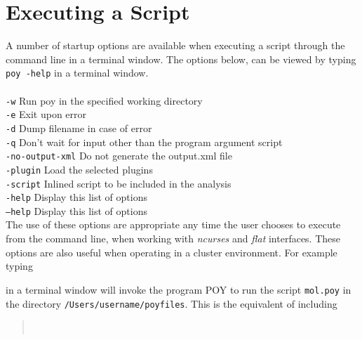 \section {Executing a Script}
\label {sec: ExecutingScript}
A number of startup options are available when executing a script through the command line in a 
terminal window. The options below, can be viewed by typing \texttt{poy -help} in a terminal window.\\
\\
\texttt{-w} \hspace{0.25 cm} Run poy in the specified working directory\\
\texttt{-e}  \hspace{0.25 cm} Exit upon error\\
\texttt{-d}  \hspace{0.25 cm} Dump filename in case of error\\
\texttt{-q}  \hspace{0.25 cm} Don't wait for input other than the program argument script\\
\texttt{-no-output-xml}  \hspace{0.25 cm} Do not generate the output.xml file\\
\texttt{-plugin}  \hspace{0.25 cm} Load the selected plugins\\
\texttt{-script}  \hspace{0.25 cm} Inlined script to be included in the analysis\\
\texttt{-help}  \hspace{0.25 cm} Display this list of options\\
\texttt{--help}  \hspace{0.25 cm} Display this list of options\\

The use of these options are appropriate any time the user chooses to execute \poy from the command line,  when 
working with \emph{ncurses} and \emph{flat} interfaces. These options are also useful when operating \poy in a cluster environment. 
For example typing

\begin{quote}
\end{quote}
in a terminal window will invoke the program POY to run the script \texttt{mol.poy} in the directory 
\texttt{/Users/username/poyfiles}.  This is the equivalent of including

\begin{quote}
\\
\end{quote}

